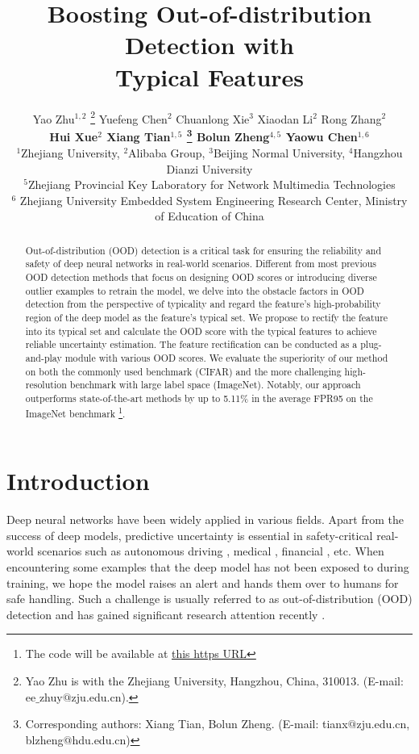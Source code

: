 \documentclass{article}
\title{Boosting Out-of-distribution Detection with\\ Typical Features}
\author{Yao Zhu$^{1,2}$ \thanks{Yao Zhu is with the Zhejiang University, Hangzhou, China, 310013. (E-mail: ee$\_$zhuy$@$zju.edu.cn).} \quad Yuefeng Chen$^{2}$ \quad Chuanlong Xie$^{3}$ \quad Xiaodan Li$^{2}$ \quad Rong Zhang$^{2}$ \\ 
  \textbf{\quad Hui Xue$^{2}$ \quad Xiang Tian$^{1,5}$ \thanks{Corresponding authors: Xiang Tian, Bolun Zheng. (E-mail: tianx$@$zju.edu.cn, blzheng$@$hdu.edu.cn)} \quad Bolun Zheng$^{4,5}$ \quad Yaowu Chen$^{1,6}$} \\
  $^{1}$Zhejiang University, $^{2}$Alibaba Group, $^{3}$Beijing Normal University, $^{4}$Hangzhou Dianzi University\\ $^{5}$Zhejiang Provincial Key Laboratory for Network Multimedia Technologies \\
  $^{6}$ Zhejiang University Embedded System Engineering Research Center, Ministry of Education of China
}
\begin{document}
\maketitle


\begin{abstract}
Out-of-distribution (OOD) detection is a critical task for ensuring the reliability and safety of deep neural networks in real-world scenarios.
Different from most previous OOD detection methods that focus on designing OOD scores or introducing diverse outlier examples to retrain the model, we delve into the obstacle factors in OOD detection from the perspective of typicality and regard the feature's high-probability region of the deep model as the feature's typical set.
We propose to rectify the feature into its typical set and calculate the OOD score with the typical features to achieve reliable uncertainty estimation.
The feature rectification can be conducted as a {plug-and-play} module with various OOD scores.
We evaluate the superiority of our method on both the commonly used benchmark (CIFAR) and the more challenging high-resolution benchmark with large label space (ImageNet). Notably, our approach outperforms state-of-the-art methods by up to 5.11$\%$ in the average FPR95 on the ImageNet benchmark \footnote{The code will be available at \href{https://github.com/alibaba/easyrobust}{this https URL}}.  
\end{abstract}



\section{Introduction} 
Deep neural networks have been widely applied in various fields. Apart from the success of deep models,  predictive uncertainty is essential in safety-critical real-world scenarios such as autonomous driving \cite{geiger2012wedrive,huang2020surveydrive}, medical \cite{litjens2017surveymedical}, financial \cite{ozbayoglu2020deepfinancial}, etc. When encountering some examples that the deep model has not been exposed to during training, we hope the model raises an alert and hands them over to humans for safe handling. Such a challenge is usually referred to as out-of-distribution (OOD) detection and has gained significant research attention recently \cite{liu2020energy,hendrycks17baseline,ODIN,sun2021react}.
\end{document}
